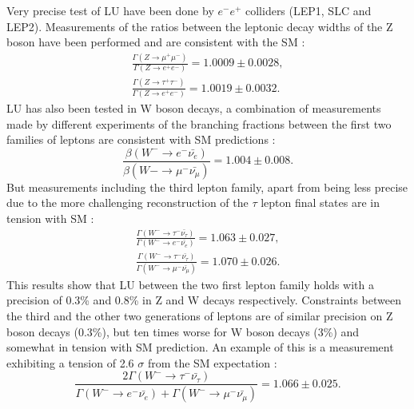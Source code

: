 Very precise test of LU have been done by $e^-e^+$ colliders (LEP1, SLC and LEP2). Measurements of the ratios between the leptonic decay widths of the Z boson have been performed and are consistent with the SM \cite{ALEPH:2005ab}:
\begin{align}
	\frac{\Gamma(Z\to\mu^+\mu^-)}{\Gamma(Z\to e^+e^-)}=1.0009\pm 0.0028,
	\\
	\frac{\Gamma(Z\to\tau^+\tau^-)}{\Gamma(Z\to e^+e^-)}=1.0019\pm 0.0032.
\end{align}
LU has also been tested in W boson decays, a combination of measurements made by different experiments of the branching fractions between the first two families of leptons are consistent with SM predictions \cite{Pich:2013lsa}:
\begin{equation}
\frac{\beta(W^-\to e^-\bar{\nu_e})}{\beta(W-\to \mu^-\bar{\nu_\mu})}=1.004\pm 0.008.
\end{equation}
But measurements including the third lepton family, apart from being less precise due to the more challenging reconstruction of the $\tau$ lepton final states are in tension with SM \cite{Schael:2013ita}:
\begin{align}
\frac{\Gamma(W^-\to\tau^-\bar{\nu_\tau})}{\Gamma(W^-\to e^-\bar{\nu_e})}=1.063\pm 0.027,
\\
\frac{\Gamma(W^-\to\tau^-\bar{\nu_\tau})}{\Gamma(W^-\to \mu^-\bar{\nu_\mu})}=1.070\pm 0.026.
\end{align}
This results show that LU between the two first lepton family holds with a precision of 0.3\% and 0.8\% in Z and W decays respectively. Constraints between the third and the other two generations of leptons are of similar precision on Z boson decays (0.3\%), but ten times worse for W boson decays (3\%) and somewhat in tension with SM prediction. An example of this is a measurement exhibiting a tension of 2.6 $\sigma$ from the SM expectation \cite{Schael:2013ita}:
\begin{equation}
	\frac{2\Gamma(W^-\to\tau^-\bar{\nu_\tau})}{\Gamma(W^-\to e^-\bar{\nu_e})+\Gamma(W^-\to \mu^-\bar{\nu_\mu})}=1.066\pm 0.025.
\end{equation}  


